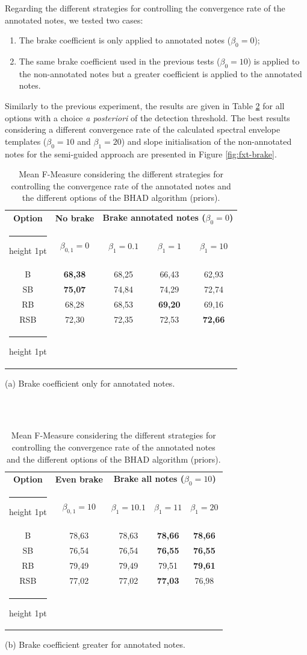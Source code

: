 \documentclass{article}
\makeatletter
\newcommand{\thickhline}{%
    \noalign {\ifnum 0=`}\fi \hrule height 1pt
    \futurelet \reserved@a \@xhline
}
\makeatother
\begin{document}
Regarding the different strategies for controlling the convergence rate of the annotated notes, we tested two cases:

\begin{enumerate}
\item The brake coefficient is only applied to annotated notes ($\beta_0=0$);
\item The same brake coefficient used in the previous tests ($\beta_0=10$) is applied to the non-annotated notes but a greater coefficient is applied to the annotated notes.
\end{enumerate}
Similarly to the previous experiment, the results are given in Table \ref{tab:brake} for all options with a choice \textit{a posteriori} of the detection threshold. The best results considering a different convergence rate of the calculated spectral envelope templates ($\beta_0=10$ and $\beta_1=20$) and  slope initialisation of the non-annotated notes for the semi-guided approach are presented in Figure \ref{fig:fxt-brake}.


\begin{table}[htb]
\begin{tabular}{ccccc}
\hline
\textbf{Option} & \textbf{No brake} & \multicolumn{3}{c}{\textbf{Brake annotated notes ($\beta_0=0$)}} \\\thickhline
& $\beta_{0,1}=0$ & $\beta_1=0.1$ & $\beta_1=1$ & $\beta_1=10$ \\\hline
B	& \textbf{68,38} &	68,25	& 66,43 &	 62,93 \\
SB	& \textbf{75,07} &	 74,84 	& 74,29 &	 72,74 \\
RB	& 68,28 & 	 68,53 	& \textbf{69,20} & 	 69,16 \\
RSB	& 72,30 &	 72,35 	& 72,53 &	 \textbf{72,66} \\\thickhline
\end{tabular}
  \centerline{(a) Brake coefficient only for annotated notes.}
\\
\\%
\vspace{0.1cm}

\centering
 \begin{tabular}{ccccc}
 \hline
\textbf{Option} & \textbf{Even brake} & \multicolumn{3}{c}{\textbf{Brake all notes ($\beta_0=10$)}} \\\thickhline
& $\beta_{0,1}=10$ & $\beta_1=10.1$ & $\beta_1=11$ & $\beta_1=20$ \\\hline
B	& 78,63 &	78,63 & \textbf{78,66} &	\textbf{78,66} \\
SB	& 76,54 &	 76,54 &	\textbf{76,55} &	\textbf{76,55} \\
RB	& 79,49 &	 79,49 &	79,51 &	\textbf{79,61} \\
RSB	& 77,02 &	 77,02 &	\textbf{77,03} &	76,98 \\\thickhline
\end{tabular}
  \centerline{(b) Brake coefficient greater for annotated notes.}\medskip
\caption{Mean F-Measure considering the different strategies for controlling the convergence rate of the annotated notes and the different options of the BHAD algorithm (priors).}
\label{tab:brake}
\end{table}
\end{document}
